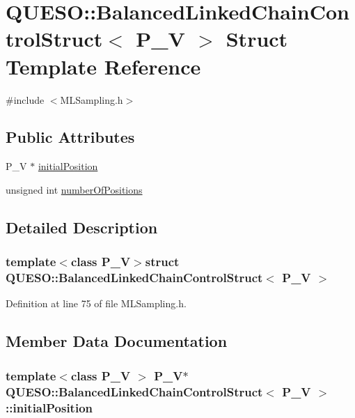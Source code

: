 \hypertarget{struct_q_u_e_s_o_1_1_balanced_linked_chain_control_struct}{\section{Q\-U\-E\-S\-O\-:\-:Balanced\-Linked\-Chain\-Control\-Struct$<$ P\-\_\-\-V $>$ Struct Template Reference}
\label{struct_q_u_e_s_o_1_1_balanced_linked_chain_control_struct}
}


{\ttfamily \#include $<$M\-L\-Sampling.\-h$>$}

\subsection*{Public Attributes}
\begin{DoxyCompactItemize}
\item 
P\-\_\-\-V $\ast$ \hyperlink{struct_q_u_e_s_o_1_1_balanced_linked_chain_control_struct_a682e9913c2635f421741bf23f45367eb}{initial\-Position}
\item 
unsigned int \hyperlink{struct_q_u_e_s_o_1_1_balanced_linked_chain_control_struct_aeee66de097885f91bcbeabc03d437b63}{number\-Of\-Positions}
\end{DoxyCompactItemize}


\subsection{Detailed Description}
\subsubsection*{template$<$class P\-\_\-\-V$>$struct Q\-U\-E\-S\-O\-::\-Balanced\-Linked\-Chain\-Control\-Struct$<$ P\-\_\-\-V $>$}



Definition at line 75 of file M\-L\-Sampling.\-h.



\subsection{Member Data Documentation}
\hypertarget{struct_q_u_e_s_o_1_1_balanced_linked_chain_control_struct_a682e9913c2635f421741bf23f45367eb}{
\subsubsection[{initial\-Position}]{\setlength{\rightskip}{0pt plus 5cm}template$<$class P\-\_\-\-V $>$ P\-\_\-\-V$\ast$ {\bf Q\-U\-E\-S\-O\-::\-Balanced\-Linked\-Chain\-Control\-Struct}$<$ P\-\_\-\-V $>$\-::initial\-Position}}\label{struct_q_u_e_s_o_1_1_balanced_linked_chain_control_struct_a682e9913c2635f421741bf23f45367eb}



